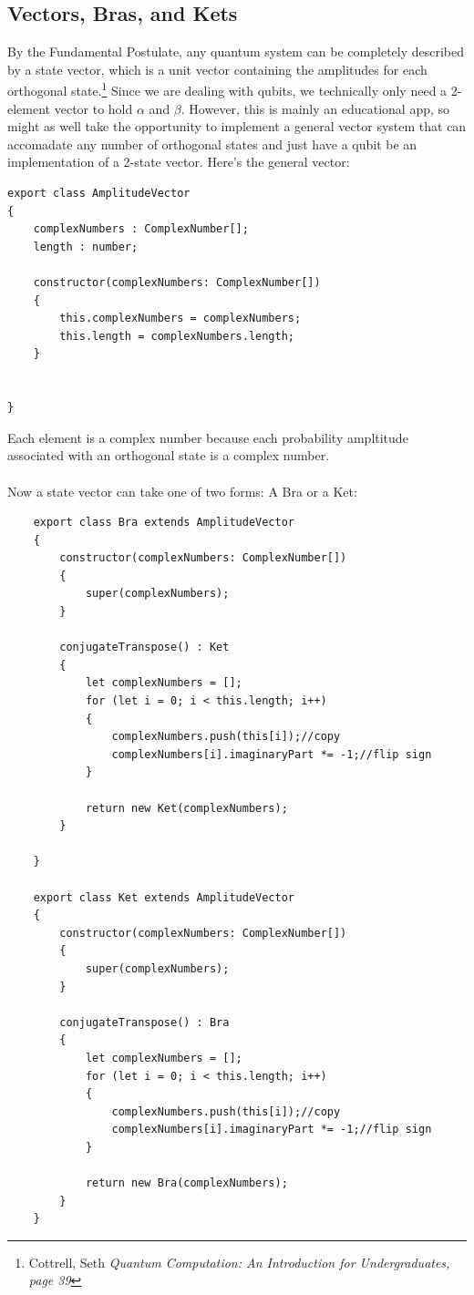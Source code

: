 \documentclass{article}
\begin{document}
\subsection{Vectors, Bras, and Kets}
By the Fundamental Postulate, any quantum system can be completely described by a state vector, which is a unit vector containing the amplitudes for each orthogonal state.\footnote{Cottrell, Seth \textit{Quantum Computation: An Introduction for Undergraduates, page 39}}
Since we are dealing with qubits, we technically only need a 2-element vector to hold \(\alpha\) and \(\beta\). 
However, this is mainly an educational app, so might as well take the opportunity to implement a general vector system that can accomadate any number of orthogonal states and just have a qubit be an implementation of a 2-state vector.
Here's the general vector: 
\begin{verbatim}
export class AmplitudeVector
{
    complexNumbers : ComplexNumber[];
    length : number;

    constructor(complexNumbers: ComplexNumber[])
    {
        this.complexNumbers = complexNumbers;
        this.length = complexNumbers.length;
    }

    
}
\end{verbatim}
Each element is a complex number because each probability ampltitude associated with an orthogonal state is a complex number.\\
\\
Now a state vector can take one of two forms: A Bra or a Ket:
\begin{verbatim}
    export class Bra extends AmplitudeVector 
    {
        constructor(complexNumbers: ComplexNumber[])
        {
            super(complexNumbers);
        }

        conjugateTranspose() : Ket
        {
            let complexNumbers = [];
            for (let i = 0; i < this.length; i++)
            {
                complexNumbers.push(this[i]);//copy
                complexNumbers[i].imaginaryPart *= -1;//flip sign
            }

            return new Ket(complexNumbers);
        }

    }

    export class Ket extends AmplitudeVector 
    {
        constructor(complexNumbers: ComplexNumber[])
        {
            super(complexNumbers);
        }

        conjugateTranspose() : Bra
        {
            let complexNumbers = [];
            for (let i = 0; i < this.length; i++)
            {
                complexNumbers.push(this[i]);//copy
                complexNumbers[i].imaginaryPart *= -1;//flip sign
            }

            return new Bra(complexNumbers);
        }
    }
\end{verbatim}
\end{document}
